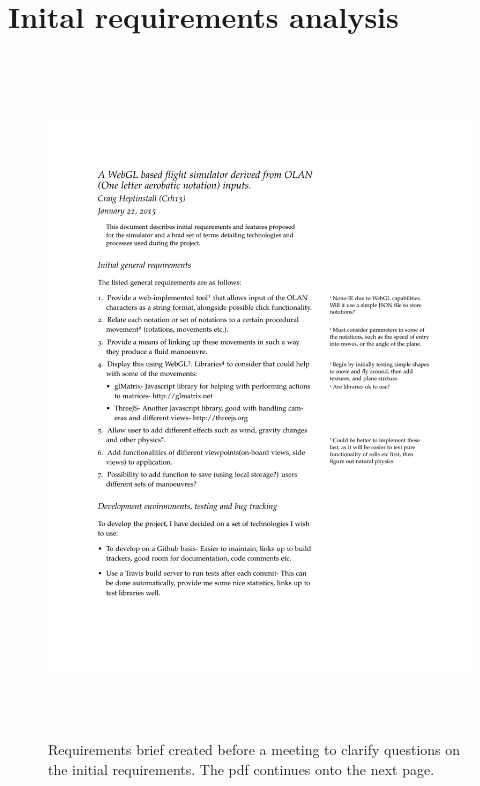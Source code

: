 \section{Inital requirements analysis}
\begin{figure}[h!]
	\label{app:init}
	\caption{Requirements brief created before a meeting to clarify questions on the initial requirements. The pdf continues onto the next page.}
	\includegraphics[width=18cm,height=18cm,page=1]{images/init.pdf}
\end{figure}

